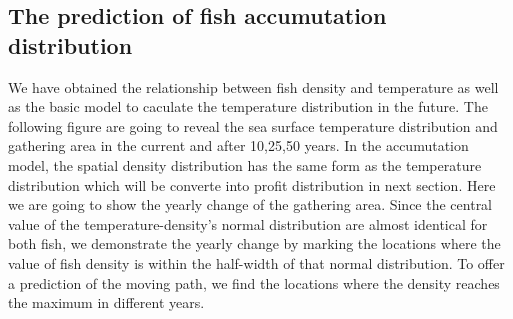 \documentclass{mcmthesis}
\begin{document}
\subsection{The prediction of fish accumutation distribution}
  We have obtained the relationship between fish density and temperature as well as the basic model to caculate the temperature distribution in the future. The following figure are going to reveal the sea surface temperature distribution and gathering area in the current and after 10,25,50 years. In the accumutation model, the spatial density distribution has the same form as the temperature distribution which will be converte into profit distribution in next section. Here we are going to show the yearly change of the gathering area. Since the central value of the temperature-density's normal distribution are almost identical for both fish, we demonstrate the yearly change by marking the locations where the value of fish density is within the half-width of that normal distribution. To offer a prediction of the moving path, we find the locations where the density reaches the maximum in different years. 
\end{document}
